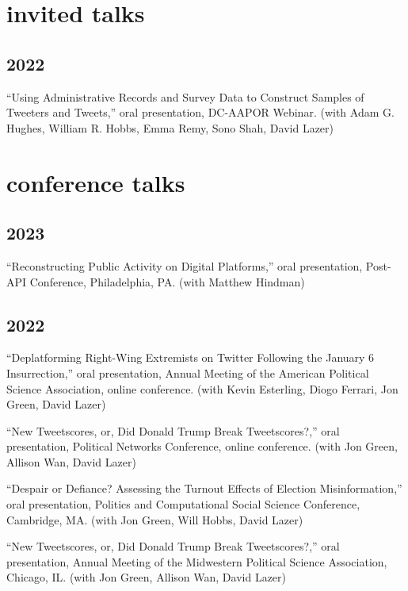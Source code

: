 \documentclass[11pt, letter]{article}
\begin{document}
\section{invited talks}
\subsection{2022}
\begin{hangparas}{.25in}{1}
``Using Administrative Records and Survey Data to Construct Samples of Tweeters and Tweets,'' oral presentation, DC-AAPOR Webinar. (with Adam G. Hughes, William R. Hobbs, Emma Remy, Sono Shah, David Lazer) \vspace{2mm}
\end{hangparas}

\vspace{2mm}
\section{conference talks}

\subsection{2023}

\begin{hangparas}{.25in}{1}
``Reconstructing Public Activity on Digital Platforms,'' oral presentation, Post-API Conference, Philadelphia, PA. (with Matthew Hindman)
\vspace{2mm}
\end{hangparas}

\subsection{2022}
\begin{hangparas}{.25in}{1}
``Deplatforming Right-Wing Extremists on Twitter Following the January 6 Insurrection,'' oral presentation, Annual Meeting of the American Political Science Association, online conference. (with Kevin Esterling, Diogo Ferrari, Jon Green, David Lazer)
\vspace{2mm}

``New Tweetscores, or, Did Donald Trump Break Tweetscores?,'' oral presentation, Political Networks Conference, online conference. (with Jon Green, Allison Wan, David Lazer)
\vspace{2mm}

``Despair or Defiance? Assessing the Turnout Effects of Election Misinformation,'' oral presentation, Politics and Computational Social Science Conference, Cambridge, MA. (with Jon Green, Will Hobbs, David Lazer)
\vspace{2mm}

``New Tweetscores, or, Did Donald Trump Break Tweetscores?,'' oral presentation, Annual Meeting of the Midwestern Political Science Association, Chicago, IL. (with Jon Green, Allison Wan, David Lazer)
\vspace{2mm}
\end{hangparas}
\end{document}
